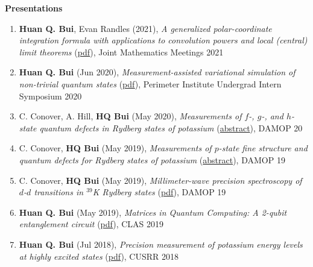 \documentclass[10pt]{article}
\begin{document}
\noindent \large{\textbf{{Presentations}}}  \normalsize  \vspace{-5pt}
\begin{enumerate}
	\setlength\itemsep{-0pt}
	\item \textbf{Huan Q. Bui}, Evan Randles (2021), \textit{A generalized polar-coordinate integration formula with applications to convolution powers and local (central) limit theorems} (\href{https://jointmathematicsmeetings.org/amsmtgs/2247_abstracts/1163-42-1122.pdf}{{pdf}}), Joint Mathematics Meetings 2021
	
	\item \textbf{Huan Q. Bui} (Jun 2020), \textit{Measurement-assisted variational simulation of non-trivial quantum states} (\href{https://huanqbui.com/LaTeX 20projects/HuanBui_Perimeter/Presentation/MBQC_as_Simulation.pdf}{{pdf}}), Perimeter Institute Undergrad Intern Symposium 2020
	
	\item C. Conover, A. Hill, \textbf{HQ Bui} (May 2020), \textit{Measurements of $f$-, $g$-, and $h$-state quantum defects in Rydberg states of potassium} (\href{http://meetings.aps.org/Meeting/DAMOP20/Session/K01.17}{abstract}),  DAMOP 20
	
	\item C. Conover, \textbf{HQ Bui} (May 2019), \textit{Measurements of $p$-state fine structure and quantum defects for Rydberg states of potassium} (\href{https://ui.adsabs.harvard.edu/abs/2019APS..DMPL01169C/abstract}{{abstract}}), DAMOP 19
	
	\item C. Conover, \textbf{HQ Bui} (May 2019), \textit{Millimeter-wave precision spectroscopy of $d$-$d$ transitions in $^{\text{39}}$K Rydberg states} (\href{https://huanqbui.com/research/DAMOP19 20poster/DAMOP19.pdf}{{pdf}}), DAMOP 19
	
	\item \textbf{Huan Q. Bui} (May 2019), \textit{Matrices in Quantum Computing: A 2-qubit entanglement circuit} (\href{https://huanqbui.com/LaTeX 20projects/Matrix_Analysis/CLAS 202019/Quantum-Circuit.pdf}{{pdf}}), CLAS 2019
	
	\item \textbf{Huan Q. Bui} (Jul 2018), \textit{Precision measurement of potassium energy levels at highly excited states} (\href{https://huanqbui.com/research/CUSRR2018.pdf}{{pdf}}), CUSRR 2018
\end{enumerate}
\end{document}

